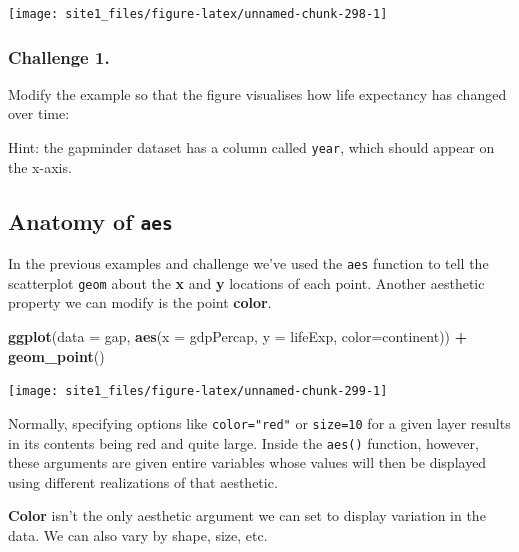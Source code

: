 \documentclass[]{book}
\newenvironment{Shaded}{\begin{snugshade}}{\end{snugshade}}
\newcommand{\DataTypeTok}[1]{\textcolor[rgb]{0.13,0.29,0.53}{#1}}
\newcommand{\KeywordTok}[1]{\textcolor[rgb]{0.13,0.29,0.53}{\textbf{#1}}}
\newcommand{\NormalTok}[1]{#1}
\newcommand{\OperatorTok}[1]{\textcolor[rgb]{0.81,0.36,0.00}{\textbf{#1}}}
\newcommand{\StringTok}[1]{\textcolor[rgb]{0.31,0.60,0.02}{#1}}
\begin{document}
\begin{center}\texttt{[image: site1\_files/figure-latex/unnamed-chunk-298-1]} \end{center}

\hypertarget{challenge-1.-8}{%
\subsubsection*{Challenge 1.}\label{challenge-1.-8}}

Modify the example so that the figure visualises how life expectancy has changed over time:

Hint: the gapminder dataset has a column called \texttt{year}, which should appear on the x-axis.

\hypertarget{anatomy-of-aes}{%
\subsection{\texorpdfstring{Anatomy of \texttt{aes}}{Anatomy of aes}}\label{anatomy-of-aes}}

In the previous examples and challenge we've used the \texttt{aes} function to tell the scatterplot \texttt{geom} about the \textbf{x} and \textbf{y} locations of each point. Another aesthetic property we can modify is the point \textbf{color}.

\begin{Shaded}
\begin{Highlighting}[]
\KeywordTok{ggplot}\NormalTok{(}\DataTypeTok{data =}\NormalTok{ gap, }\KeywordTok{aes}\NormalTok{(}\DataTypeTok{x =}\NormalTok{ gdpPercap, }\DataTypeTok{y =}\NormalTok{ lifeExp, }\DataTypeTok{color=}\NormalTok{continent)) }\OperatorTok{+}\StringTok{ }
\StringTok{  }\KeywordTok{geom_point}\NormalTok{()}
\end{Highlighting}
\end{Shaded}

\begin{center}\texttt{[image: site1\_files/figure-latex/unnamed-chunk-299-1]} \end{center}

Normally, specifying options like \texttt{color="red"} or \texttt{size=10} for a given layer results in its contents being red and quite large. Inside the \texttt{aes()} function, however, these arguments are given entire variables whose values will then be displayed using different realizations of that aesthetic.

\textbf{Color} isn't the only aesthetic argument we can set to display variation in the data. We can also vary by shape, size, etc.
\end{document}
